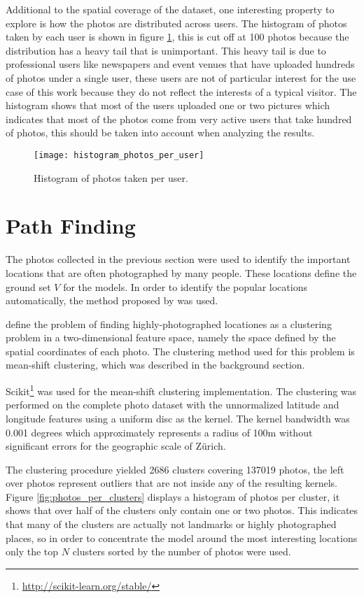Additional to the spatial coverage of the dataset, one interesting property to explore is how the photos are distributed across users. The histogram of photos taken by each user is shown in figure \ref{fig:photo_user_distribution}, this is cut off at 100 photos because the distribution has a heavy tail that is unimportant. This heavy tail is due to professional users like newspapers and event venues that have uploaded hundreds of photos under a single user, these users are not of particular interest for the use case of this work because they do not reflect the interests of a typical visitor. The histogram shows that most of the users uploaded one or two pictures which indicates that most of the photos come from very active users that take hundred of photos, this should be taken into account when analyzing the results.

\begin{figure}
  \centering
  \texttt{[image: histogram\_photos\_per\_user]}
  \caption{Histogram of photos taken per user.}
  \label{fig:photo_user_distribution}
\end{figure}

\section{Path Finding}
\label{sec:path_discovery}

The photos collected in the previous section were used to identify the important locations that are often photographed by many people. These locations define the ground set $V$ for the models. In order to identify the popular locations automatically, the method proposed by \citet{Kleinberg2009} was used.

\citet{Kleinberg2009} define the problem of finding highly-photographed locationes as a clustering problem in a two-dimensional feature space, namely the space defined by the spatial coordinates of each photo. The clustering method used for this problem is mean-shift clustering, which was described in the background section.

Scikit\footnote{\url{http://scikit-learn.org/stable/}} was used for the mean-shift clustering implementation. The clustering was performed on the complete photo dataset with the unnormalized latitude and longitude features using a uniform disc as the kernel. The kernel bandwidth was 0.001 degrees which approximately represents a radius of 100m without significant errors for the geographic scale of Zürich.

The clustering procedure yielded 2686 clusters covering 137019 photos, the left over photos represent outliers that are not inside any of the resulting kernels. Figure \ref{fig:photos_per_clusters} displays a histogram of photos per cluster, it shows that over half of the clusters only contain one or two photos. This indicates that many of the clusters are actually not landmarks or highly photographed places, so in order to concentrate the model around the most interesting locations only the top $N$ clusters sorted by the number of photos were used.

